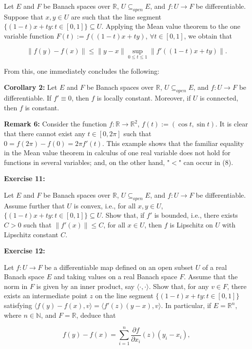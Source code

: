 \documentclass{book}
\begin{document}
Let $E$ and $F$ be Banach spaces over $\mathbb{R}$, $U \subseteq_{open} E$, and $f : U \to F$ be differentiable. Suppose that $x, y \in U$ are such that the line segment $\{(1 - t)x + ty : t \in [0, 1]\} \subseteq U$. Applying the Mean value theorem to the one variable function $F(t) := f((1 - t)x + ty)$, $\forall t \in [0, 1]$, we obtain that

\[
\|f(y) - f(x)\| \leq \|y - x\| \sup_{0 \leq t \leq 1} \|f'((1 - t)x + ty)\|.
\tag{8}
\]

From this, one immediately concludes the following:

\textbf{Corollary 2:} Let $E$ and $F$ be Banach spaces over $\mathbb{R}$, $U \subseteq_{open} E$, and $f : U \to F$ be differentiable. If $f' \equiv 0$, then $f$ is locally constant. Moreover, if $U$ is connected, then $f$ is constant.

\textbf{Remark 6:} Consider the function $f : \mathbb{R} \to \mathbb{R}^2$, $f(t) := (\cos t, \sin t)$. It is clear that there cannot exist any $t \in [0, 2\pi]$ such that $0 = f(2\pi) - f(0) = 2\pi f'(t)$. This example shows that the familiar equality in the Mean value theorem in calculus of one real variable does not hold for functions in several variables; and, on the other hand, "$<$" can occur in (8).


\textbf{Exercise 11:}

Let $E$ and $F$ be Banach spaces over $\mathbb{R}$, $U \subseteq_{open} E$, and $f : U \to F$ be differentiable. Assume further that $U$ is convex, i.e., for all $x, y \in U$, $\{(1 - t)x + ty : t \in [0, 1]\} \subseteq U$. Show that, if $f'$ is bounded, i.e., there exists $C > 0$ such that $\|f'(x)\| \leq C$, for all $x \in U$, then $f$ is Lipschitz on $U$ with Lipschitz constant $C$.

\textbf{Exercise 12:}

Let $f : U \to F$ be a differentiable map defined on an open subset $U$ of a real Banach space $E$ and taking values on a real Banach space $F$. Assume that the norm in $F$ is given by an inner product, say $\langle \cdot, \cdot \rangle$. Show that, for any $v \in F$, there exists an intermediate point $z$ on the line segment $\{(1 - t)x + ty : t \in [0, 1]\}$ satisfying $\langle f(y) - f(x), v \rangle = \langle f'(z)(y - x), v \rangle$. In particular, if $E = \mathbb{R}^n$, where $n \in \mathbb{N}$, and $F = \mathbb{R}$, deduce that

\[
f(y) - f(x) = \sum_{i=1}^{n} \frac{\partial f}{\partial x_i}(z) (y_i - x_i),
\]
\end{document}
